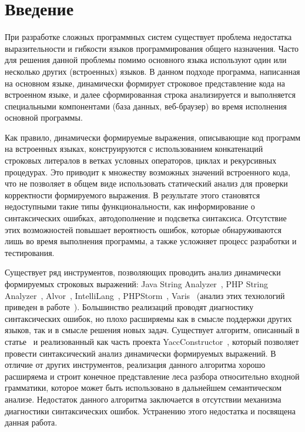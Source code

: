 \section*{Введение}

При разработке сложных программных систем существует проблема недостатка выразительности и гибкости языков программирования общего назначения. Часто для решения данной проблемы помимо основного языка используют один или несколько других (встроенных) языков. В данном подходе программа, написанная на основном языке, динамически формирует строковое представление кода на встроенном языке, и далее сформированная строка анализируется и выполняется специальными компонентами (база данных, веб-браузер) во время исполнения основной программы.

Как правило, динамически формируемые выражения, описывающие код программ на встроенных языках, конструируются с использованием конкатенаций строковых литералов в ветках условных операторов, циклах и рекурсивных процедурах. Это приводит к множеству возможных значений встроенного кода, что не позволяет в общем виде использовать статический анализ для проверки корректности формируемого выражения. В результате этого становятся недоступными такие типы функциональности, как информирование о синтаксических ошибках, автодополнение и подсветка синтаксиса. Отсутствие этих возможностей повышает вероятность ошибок, которые обнаруживаются лишь во время выполнения программы, а также усложняет процесс разработки и тестирования.

Существует ряд инструментов, позволяющих проводить анализ динамически формируемых строковых выражений: Java String Analyzer~\cite{JSA,JSAUrl}, PHP String Analyzer~\cite{PHPSA}, Alvor~\cite{Alvor1, Alvor2, AlvorUrl}, IntelliLang~\cite{IntelliLang}, PHPStorm~\cite{PHPStorm}, Varis~\cite{Varis} (анализ этих технологий приведен в работе~\cite{SemonPHD}). Большинство реализаций проводят диагностику синтаксических ошибок, но плохо расширяемы как в смысле поддержки других языков, так и в смысле решения новых задач. Существует алгоритм, описанный в статье~\cite{ARNGLR} и реализованный как часть проекта YaccConstructor~\cite{YC}, который позволяет провести синтаксический анализ динамически формируемых выражений. В отличие от других инструментов, реализация данного алгоритма хорошо расширяема и строит конечное представление леса разбора относительно входной грамматики, которое может быть использовано в дальнейшем семантическом анализе. Недостаток данного алгоритма заключается в отсутствии механизма диагностики синтаксических ошибок. Устранению этого недостатка и посвящена данная работа.
